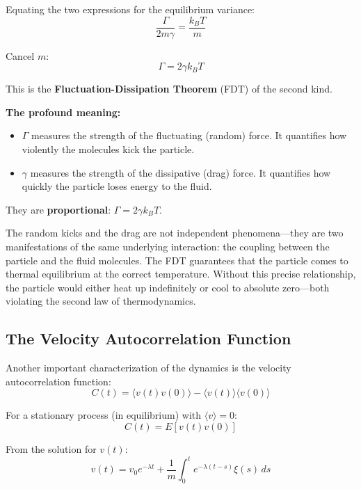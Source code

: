 \documentclass[11pt,a4paper]{article}
\begin{document}
	Equating the two expressions for the equilibrium variance:
	\begin{equation}
		\frac{\Gamma}{2m\gamma} = \frac{k_B T}{m}
	\end{equation}
	
	Cancel $m$:
	\begin{equation}
		\boxed{\Gamma = 2\gamma k_B T}
	\end{equation}
	
	This is the \textbf{Fluctuation-Dissipation Theorem} (FDT) of the second kind.
	
	\textbf{The profound meaning:}
	
	\begin{itemize}
		\item \textbf{$\Gamma$} measures the strength of the fluctuating (random) force. It quantifies how violently the molecules kick the particle.
		\item \textbf{$\gamma$} measures the strength of the dissipative (drag) force. It quantifies how quickly the particle loses energy to the fluid.
	\end{itemize}
	
	They are \textbf{proportional}: $\Gamma = 2\gamma k_B T$.
	
	The random kicks and the drag are not independent phenomena---they are two manifestations of the same underlying interaction: the coupling between the particle and the fluid molecules. The FDT guarantees that the particle comes to thermal equilibrium at the correct temperature. Without this precise relationship, the particle would either heat up indefinitely or cool to absolute zero---both violating the second law of thermodynamics.
	
	\subsection{The Velocity Autocorrelation Function}
	
	Another important characterization of the dynamics is the velocity autocorrelation function:
	\begin{equation}
		C(t) = \langle v(t) v(0) \rangle - \langle v(t) \rangle \langle v(0) \rangle
	\end{equation}
	
	For a stationary process (in equilibrium) with $\langle v \rangle = 0$:
	\begin{equation}
		C(t) = E[v(t) v(0)]
	\end{equation}
	
	From the solution for $v(t)$:
	\begin{equation}
		v(t) = v_0 e^{-\lambda t} + \frac{1}{m} \int_0^t e^{-\lambda(t-s)} \xi(s) \, ds
	\end{equation}
	
\end{document}
